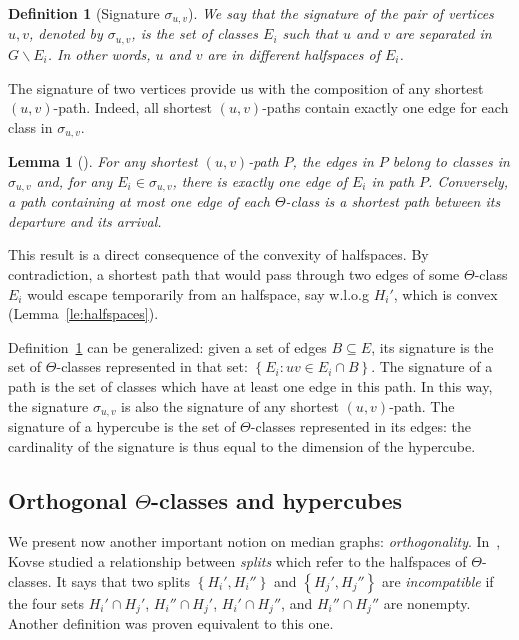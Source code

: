 \documentclass{article}
\newtheorem{definition}{Definition}
\newtheorem{lemma}{Lemma}
\newcommand{\set}[1]{\left\{ #1 \right\}}
\begin{document}
\begin{definition}[Signature $\sigma_{u,v}$]
We say that the {\em signature} of the pair of vertices $u,v$, denoted by $\sigma_{u,v}$, is the set of classes $E_i$ such that $u$ and $v$ are separated in $G\backslash E_i$. In other words, $u$ and $v$ are in different halfspaces of $E_i$.
\label{def:signature}
\end{definition}

The signature of two vertices provide us with the composition of any shortest $(u,v)$-path. Indeed, all shortest $(u,v)$-paths contain exactly one edge for each class in $\sigma_{u,v}$.

\begin{lemma}[\cite{BeHa21}]
For any shortest $(u,v)$-path $P$, the edges in $P$ belong to classes in $\sigma_{u,v}$ and, for any $E_i \in \sigma_{u,v}$, there is exactly one edge of $E_i$ in path $P$. Conversely, a path containing at most one edge of each $\Theta$-class is a shortest path between its departure and its arrival.
\label{le:signature}
\end{lemma}

This result is a direct consequence of the convexity of halfspaces. By contradiction, a shortest path that would pass through two edges of some $\Theta$-class $E_i$ would escape temporarily from an halfspace, say w.l.o.g $H_i'$,  which is convex (Lemma~\ref{le:halfspaces}).

Definition~\ref{def:signature} can be generalized: given a set of edges $B\subseteq E$, its signature is the set of $\Theta$-classes represented in that set: $\set{E_i : uv \in E_i \cap B}$. The signature of a path is the set of classes which have at least one edge in this path. In this way, the signature $\sigma_{u,v}$ is also the signature of any shortest $(u,v)$-path. The signature of a hypercube is the set of $\Theta$-classes represented in its edges: the cardinality of the signature is thus equal to the dimension of the hypercube.

\subsection{Orthogonal $\Theta$-classes and hypercubes}

We present now another important notion on median graphs: \textit{orthogonality}. In~\cite{Ko09}, Kovse studied a relationship between \textit{splits} which refer to the halfspaces of $\Theta$-classes. It says that two splits $\set{H_i',H_i''}$ and $\set{H_j',H_j''}$ are \textit{incompatible} if the four sets $H_i' \cap H_j'$, $H_i'' \cap H_j'$, $H_i' \cap H_j''$, and $H_i'' \cap H_j''$ are nonempty. Another definition was proven equivalent to this one.
\end{document}
